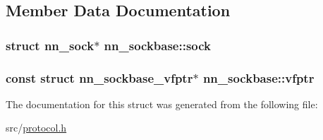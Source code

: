 \subsection{Member Data Documentation}
\subsubsection[{sock}]{\setlength{\rightskip}{0pt plus 5cm}struct {\bf nn\+\_\+sock}$\ast$ nn\+\_\+sockbase\+::sock}\hypertarget{structnn__sockbase_a1a189b35cfe4078398f47c623a1083cd}{}\label{structnn__sockbase_a1a189b35cfe4078398f47c623a1083cd}
\subsubsection[{vfptr}]{\setlength{\rightskip}{0pt plus 5cm}const struct {\bf nn\+\_\+sockbase\+\_\+vfptr}$\ast$ nn\+\_\+sockbase\+::vfptr}\hypertarget{structnn__sockbase_a8e1306c5c153b58c9aa74a100ffa1faf}{}\label{structnn__sockbase_a8e1306c5c153b58c9aa74a100ffa1faf}


The documentation for this struct was generated from the following file\+:\begin{DoxyCompactItemize}
\item 
src/\hyperlink{protocol_8h}{protocol.\+h}\end{DoxyCompactItemize}

